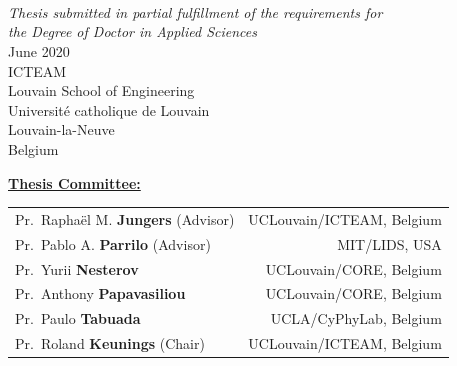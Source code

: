 \thispagestyle{empty}

\begin{center}
\vspace{0.5cm}
{\bf \huge \textsc \thesisTitle}\\
~\\
\vspace{0.5cm}
\large \thesisAuthor\\
\vspace{1cm}
{\em Thesis submitted in partial fulfillment of the requirements for\\
the Degree of Doctor in Applied Sciences}\\
\vspace{1cm}
June 2020\\
\vspace{1cm}
ICTEAM\\
Louvain School of Engineering\\
Universit\'{e} catholique de Louvain\\
Louvain-la-Neuve\\
Belgium\\
\end{center}

\vspace{6.5cm}

\noindent\underline{\bf Thesis Committee:}\\
\begin{tabular}{lr}
Pr.~Rapha\"el M. {\bf Jungers} (Advisor) & UCLouvain/ICTEAM, Belgium\\
Pr.~Pablo A. {\bf Parrilo} (Advisor) & MIT/LIDS, USA\\
Pr.~Yurii {\bf Nesterov} & UCLouvain/CORE, Belgium\\
Pr.~Anthony {\bf Papavasiliou} & UCLouvain/CORE, Belgium\\
Pr.~Paulo {\bf Tabuada} & UCLA/CyPhyLab, Belgium\\
Pr.~Roland {\bf Keunings} (Chair) & UCLouvain/ICTEAM, Belgium\\
\end{tabular}
